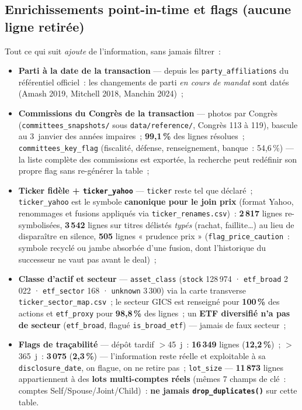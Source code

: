 \documentclass[11pt,a4paper]{article}
\newcommand{\co}[1]{\texttt{\small #1}}
\begin{document}
\subsection{Enrichissements point-in-time et flags (aucune ligne retirée)}
Tout ce qui suit \emph{ajoute} de l'information, sans jamais filtrer~:
\begin{itemize}[nosep,leftmargin=1.5em]
\item \textbf{Parti à la date de la transaction} — depuis les \co{party_affiliations} du référentiel
officiel~: les changements de parti \emph{en cours de mandat} sont datés (Amash 2019, Mitchell 2018,
Manchin 2024)~;
\item \textbf{Commissions du Congrès de la transaction} — photos par Congrès
(\co{committees_snapshots/} sous \co{data/reference/}, Congrès 113 à 119), bascule au 3~janvier des
années impaires~;
\textbf{99,1\,\%} des lignes résolues~; \co{committees_key_flag} (fiscalité, défense, renseignement,
banque~: 54,6\,\%) — la liste complète des commissions est exportée, la recherche peut redéfinir son propre
flag sans re-générer la table~;
\item \textbf{Ticker fidèle + \co{ticker_yahoo}} — \co{ticker} reste tel que déclaré~; \co{ticker_yahoo}
est le symbole \textbf{canonique pour le join prix} (format Yahoo, renommages et fusions appliqués via
\co{ticker_renames.csv})~: \textbf{2\,817} lignes re-symbolisées, \textbf{3\,542} lignes sur titres
délistés \emph{typés} (rachat, faillite\dots) au lieu de disparaître en silence, \textbf{505} lignes
« prudence prix » (\co{flag_price_caution}~: symbole recyclé ou jambe absorbée d'une fusion, dont
l'historique du successeur ne vaut pas avant le deal)~;
\item \textbf{Classe d'actif et secteur} — \co{asset_class} (\co{stock} 128\,974 · \co{etf_broad} 2\,022 ·
\co{etf_sector} 168 · \co{unknown} 3\,300) via la carte transverse \co{ticker_sector_map.csv}~; le secteur
GICS est renseigné pour \textbf{100\,\%} des actions et \co{etf_proxy} pour \textbf{98,8\,\%} des lignes~;
un \textbf{ETF diversifié n'a pas de secteur} (\co{etf_broad}, flagué \co{is_broad_etf}) — jamais de faux
secteur~;
\item \textbf{Flags de traçabilité} — dépôt tardif $>$45~j~: \textbf{16\,349} lignes
(\textbf{12,2\,\%})~; $>$365~j~: \textbf{3\,075} (\textbf{2,3\,\%}) — l'information reste réelle et
exploitable à sa \co{disclosure_date}, on flague, on ne retire pas~; \co{lot_size} — \textbf{11\,873}
lignes appartiennent à des \textbf{lots multi-comptes réels} (mêmes 7 champs de clé~: comptes
Self/Spouse/Joint/Child)~: \textbf{ne jamais \co{drop_duplicates()}} sur cette table.
\end{itemize}
\end{document}
